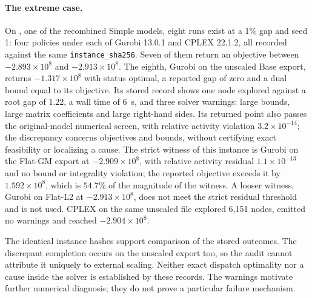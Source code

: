 \documentclass[11pt]{article}
\begin{document}
\paragraph{The extreme case.} On , one of the recombined Simple models,
eight runs exist at a 1\% gap and seed 1: four policies under each of Gurobi 13.0.1 and CPLEX
22.1.2, all recorded against the same \texttt{instance\_sha256}. Seven of them return an
objective between $-2.893\times10^8$ and $-2.913\times10^8$. The eighth, Gurobi on the unscaled
Base export, returns $-1.317\times10^8$ with status optimal, a reported gap of zero and a dual
bound equal to its objective. Its stored record shows one node explored against a root gap of
$1.22$, a wall time of 6~s, and three solver warnings: large bounds, large matrix coefficients
and large right-hand sides. Its returned point also passes the original-model numerical
screen, with relative activity violation $3.2\times10^{-14}$; the discrepancy concerns
objectives and bounds, without certifying exact feasibility or localizing a cause.
The strict witness of this instance is Gurobi on the Flat-GM export at $-2.909\times10^8$, with
relative activity residual $1.1\times10^{-13}$ and no bound or integrality violation; the
reported objective exceeds it by $1.592\times10^8$, which is $54.7\%$ of the magnitude of the
witness. A looser witness, Gurobi on Flat-L2 at $-2.913\times10^8$, does not meet the strict
residual threshold and is not used. CPLEX on the same unscaled file explored 6,151 nodes,
emitted no warnings and reached $-2.904\times10^8$.

The identical instance hashes support comparison of the stored outcomes. The discrepant
completion occurs on the unscaled export too, so the audit cannot attribute it uniquely to
external scaling. Neither exact dispatch optimality nor a cause inside the solver is
established by these records. The warnings motivate further numerical diagnosis; they do
not prove a particular failure mechanism.
\end{document}
